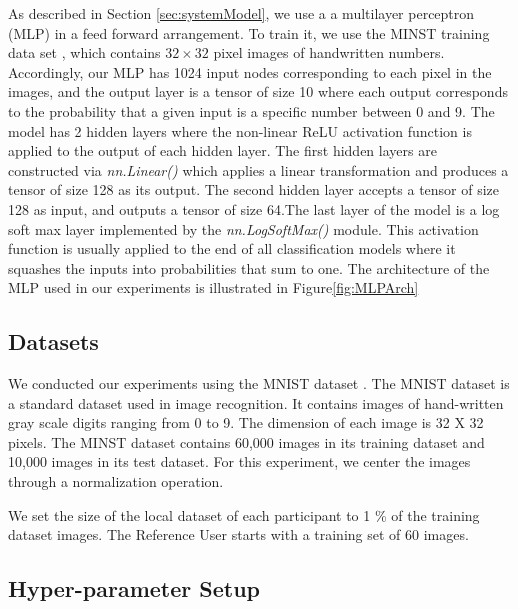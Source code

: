 \documentclass[letterpaper]{article}
\begin{document}
\begin{flushleft}
{As described in Section \ref{sec:systemModel}, we use a 
a multilayer perceptron (MLP) in a feed forward arrangement. To train it, we use the MINST training data set \cite{deng2012mnist}, which contains 
$32\times 32$ pixel images of handwritten numbers. Accordingly, our MLP has 1024 input nodes
corresponding to each pixel in the images, and the output layer is a tensor of size 10 where each output corresponds to the probability
that a given input is a specific number
between 0 and 9.  The model has 2 hidden layers where the non-linear ReLU activation function is applied to the
output of each hidden layer.  The first hidden layers are constructed via \textit{nn.Linear()} which applies a linear transformation
and produces a tensor of size 128 as its output. The second hidden layer accepts a tensor of size 128 as input, and outputs a tensor of
size 64.The last layer of the model is a log soft max layer implemented by the \textit{nn.LogSoftMax()} module.  This activation
function is usually applied to the end of all classification models where it squashes the inputs into probabilities that sum to one.
The architecture of the MLP used in our experiments is illustrated in Figure\ref{fig:MLPArch}



\subsection{Datasets}
We conducted our experiments using the MNIST dataset \cite{deng2012mnist}. The MNIST dataset is a standard dataset used in image
recognition. It contains images of hand-written gray scale digits ranging from 0 to 9. The dimension of each image is 32 X 32 pixels.
The MINST dataset contains 60,000 images in its training dataset and 10,000 images in its test dataset.
For this experiment, we center the images through a normalization operation.  

We set the size of the local dataset of each participant to 1 \% of the training dataset images.  The Reference User starts with a
training set of 60 images.


\subsection{Hyper-parameter Setup}

}
\end{flushleft}
\end{document}
